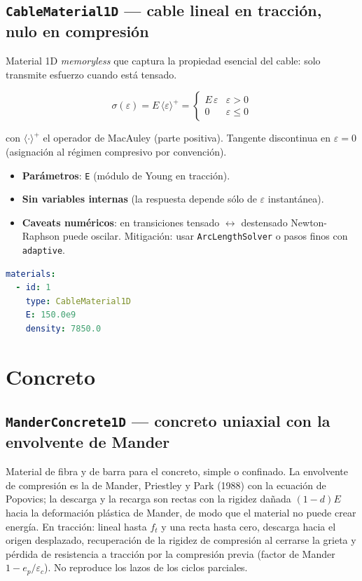 \documentclass[11pt,oneside]{report}
\begin{document}
\subsection{\texttt{CableMaterial1D} --- cable lineal en tracción, nulo en compresión}

Material 1D \textit{memoryless} que captura la propiedad esencial del cable: solo transmite esfuerzo cuando está tensado.

\[
\sigma(\varepsilon) = E\,\langle\varepsilon\rangle^+ = \begin{cases} E\,\varepsilon & \varepsilon > 0 \\ 0 & \varepsilon \le 0 \end{cases}
\]

con $\langle \cdot \rangle^+$ el operador de MacAuley (parte positiva). Tangente discontinua en $\varepsilon = 0$ (asignación al régimen compresivo por convención).

\begin{itemize}
  \item \textbf{Parámetros}: \texttt{E} (módulo de Young en tracción).
  \item \textbf{Sin variables internas} (la respuesta depende sólo de $\varepsilon$ instantánea).
  \item \textbf{Caveats numéricos}: en transiciones tensado \ensuremath{\leftrightarrow} destensado Newton-Raphson puede oscilar. Mitigación: usar \texttt{ArcLengthSolver} o pasos finos con \texttt{adaptive}.
\end{itemize}

\begin{lstlisting}[language=yaml]
materials:
  - id: 1
    type: CableMaterial1D
    E: 150.0e9
    density: 7850.0

\end{lstlisting}

\section{Concreto}

\subsection{\texttt{ManderConcrete1D} --- concreto uniaxial con la envolvente de Mander}

Material de fibra y de barra para el concreto, simple o confinado. La envolvente de compresión es la de Mander, Priestley y Park (1988) con la ecuación de Popovics; la descarga y la recarga son rectas con la rigidez dañada $(1-d)E$ hacia la deformación plástica de Mander, de modo que el material no puede crear energía. En tracción: lineal hasta $f_t$ y una recta hasta cero, descarga hacia el origen desplazado, recuperación de la rigidez de compresión al cerrarse la grieta y pérdida de resistencia a tracción por la compresión previa (factor de Mander $1 - e_p/\varepsilon_c$). No reproduce los lazos de los ciclos parciales.
\end{document}
